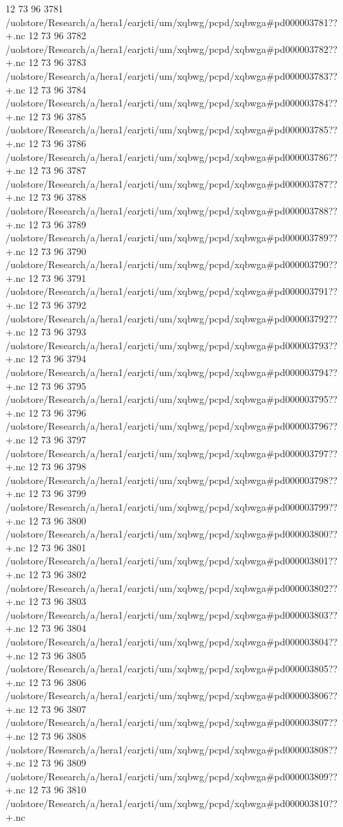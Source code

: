 12 73 96
3781
/uolstore/Research/a/hera1/earjcti/um/xqbwg/pcpd/xqbwga#pd000003781??+.nc
12 73 96
3782
/uolstore/Research/a/hera1/earjcti/um/xqbwg/pcpd/xqbwga#pd000003782??+.nc
12 73 96
3783
/uolstore/Research/a/hera1/earjcti/um/xqbwg/pcpd/xqbwga#pd000003783??+.nc
12 73 96
3784
/uolstore/Research/a/hera1/earjcti/um/xqbwg/pcpd/xqbwga#pd000003784??+.nc
12 73 96
3785
/uolstore/Research/a/hera1/earjcti/um/xqbwg/pcpd/xqbwga#pd000003785??+.nc
12 73 96
3786
/uolstore/Research/a/hera1/earjcti/um/xqbwg/pcpd/xqbwga#pd000003786??+.nc
12 73 96
3787
/uolstore/Research/a/hera1/earjcti/um/xqbwg/pcpd/xqbwga#pd000003787??+.nc
12 73 96
3788
/uolstore/Research/a/hera1/earjcti/um/xqbwg/pcpd/xqbwga#pd000003788??+.nc
12 73 96
3789
/uolstore/Research/a/hera1/earjcti/um/xqbwg/pcpd/xqbwga#pd000003789??+.nc
12 73 96
3790
/uolstore/Research/a/hera1/earjcti/um/xqbwg/pcpd/xqbwga#pd000003790??+.nc
12 73 96
3791
/uolstore/Research/a/hera1/earjcti/um/xqbwg/pcpd/xqbwga#pd000003791??+.nc
12 73 96
3792
/uolstore/Research/a/hera1/earjcti/um/xqbwg/pcpd/xqbwga#pd000003792??+.nc
12 73 96
3793
/uolstore/Research/a/hera1/earjcti/um/xqbwg/pcpd/xqbwga#pd000003793??+.nc
12 73 96
3794
/uolstore/Research/a/hera1/earjcti/um/xqbwg/pcpd/xqbwga#pd000003794??+.nc
12 73 96
3795
/uolstore/Research/a/hera1/earjcti/um/xqbwg/pcpd/xqbwga#pd000003795??+.nc
12 73 96
3796
/uolstore/Research/a/hera1/earjcti/um/xqbwg/pcpd/xqbwga#pd000003796??+.nc
12 73 96
3797
/uolstore/Research/a/hera1/earjcti/um/xqbwg/pcpd/xqbwga#pd000003797??+.nc
12 73 96
3798
/uolstore/Research/a/hera1/earjcti/um/xqbwg/pcpd/xqbwga#pd000003798??+.nc
12 73 96
3799
/uolstore/Research/a/hera1/earjcti/um/xqbwg/pcpd/xqbwga#pd000003799??+.nc
12 73 96
3800
/uolstore/Research/a/hera1/earjcti/um/xqbwg/pcpd/xqbwga#pd000003800??+.nc
12 73 96
3801
/uolstore/Research/a/hera1/earjcti/um/xqbwg/pcpd/xqbwga#pd000003801??+.nc
12 73 96
3802
/uolstore/Research/a/hera1/earjcti/um/xqbwg/pcpd/xqbwga#pd000003802??+.nc
12 73 96
3803
/uolstore/Research/a/hera1/earjcti/um/xqbwg/pcpd/xqbwga#pd000003803??+.nc
12 73 96
3804
/uolstore/Research/a/hera1/earjcti/um/xqbwg/pcpd/xqbwga#pd000003804??+.nc
12 73 96
3805
/uolstore/Research/a/hera1/earjcti/um/xqbwg/pcpd/xqbwga#pd000003805??+.nc
12 73 96
3806
/uolstore/Research/a/hera1/earjcti/um/xqbwg/pcpd/xqbwga#pd000003806??+.nc
12 73 96
3807
/uolstore/Research/a/hera1/earjcti/um/xqbwg/pcpd/xqbwga#pd000003807??+.nc
12 73 96
3808
/uolstore/Research/a/hera1/earjcti/um/xqbwg/pcpd/xqbwga#pd000003808??+.nc
12 73 96
3809
/uolstore/Research/a/hera1/earjcti/um/xqbwg/pcpd/xqbwga#pd000003809??+.nc
12 73 96
3810
/uolstore/Research/a/hera1/earjcti/um/xqbwg/pcpd/xqbwga#pd000003810??+.nc
